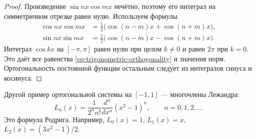 \begin{proof}

Произведение \(\sin nx\cos mx\) нечётно, поэтому его интеграл на симметричном отрезке равен нулю. Используем формулы
\[
\begin{aligned}
\cos nx\cos mx&=\tfrac12\bigl(\cos(n-m)x+\cos(n+m)x\bigr),\\
\sin nx\sin mx&=\tfrac12\bigl(\cos(n-m)x-\cos(n+m)x\bigr).
\end{aligned}
\]
Интеграл \(\cos kx\) на \([-\pi,\pi]\) равен нулю при целом \(k\ne0\) и равен \(2\pi\) при \(k=0\). Это даёт все равенства \eqref{eq-trigonometric-orthogonality} и значения норм. Ортогональность постоянной функции остальным следует из интегралов синуса и косинуса.\qedhere

\end{proof}

\begin{example}\label{exm-legendre-system}

Другой пример ортогональной системы на \([-1,1]\) --- многочлены Лежандра:
\begin{equation}
L_n(x)=\frac1{2^n n!}\frac{d^n}{dx^n}(x^2-1)^n,
\qquad n=0,1,2,\ldots
\label{eq-legendre-rodrigues}
\end{equation}
Это формула Родрига. Например, \(L_0(x)=1\), \(L_1(x)=x\), \(L_2(x)=(3x^2-1)/2\).

\end{example}
